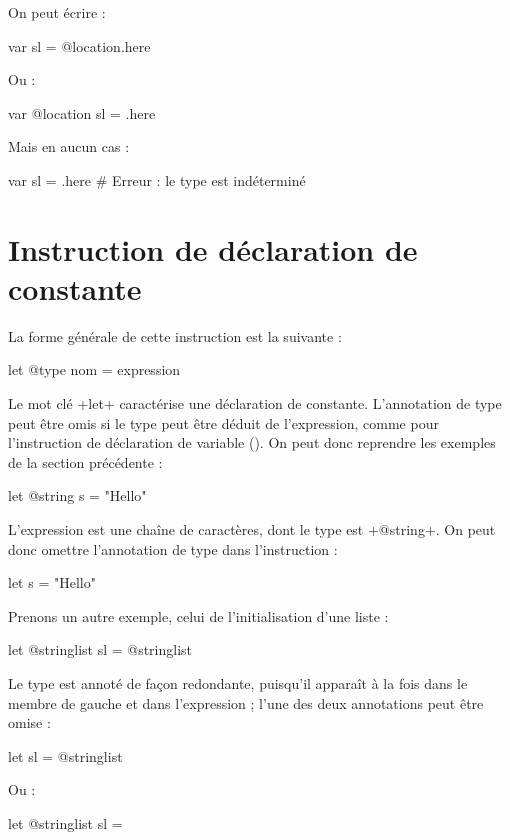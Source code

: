 On peut écrire :
\begin{galgas}
var sl = @location.here
\end{galgas}

Ou :
\begin{galgas}
var @location sl = .here
\end{galgas}

Mais en aucun cas :
\begin{galgas}
var sl = .here # Erreur : le type est indéterminé
\end{galgas}





\section{Instruction de déclaration de constante}

La forme générale de cette instruction est la suivante :

\begin{galgas}
let @type nom = expression
\end{galgas}

Le mot clé \ggs+let+ caractérise une déclaration de constante. L'annotation de type peut être omis si le type peut être déduit de l'expression, comme pour l'instruction de déclaration de variable (). On peut donc reprendre les exemples de la section précédente :
\begin{galgas}
let @string s = "Hello"
\end{galgas}

L'expression est une chaîne de caractères, dont le type est \ggs+@string+. On peut donc omettre l'annotation de type dans l'instruction :
\begin{galgas}
let s = "Hello"
\end{galgas}


Prenons un autre exemple, celui de l'initialisation d'une liste :
\begin{galgas}
let @stringlist sl = @stringlist {}
\end{galgas}

Le type est annoté de façon redondante, puisqu'il apparaît à la fois dans le membre de gauche et dans l'expression ; l'une des deux annotations peut être omise :
\begin{galgas}
let sl = @stringlist {}
\end{galgas}

Ou :
\begin{galgas}
let @stringlist sl = {}
\end{galgas}

